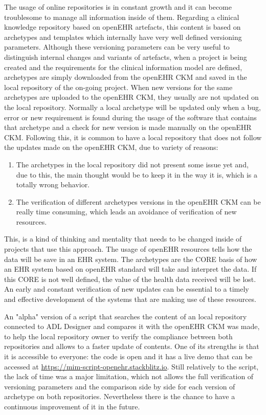 \documentclass[mim_thesis.tex]{subfiles}
\begin{document}
The usage of online repositories is in constant growth and it can become troublesome to manage all information inside of them. Regarding a clinical knowledge repository based on openEHR artefacts, this content is based on archetypes and templates which internally have very well defined versioning parameters.
Although these versioning parameters can be very useful to distinguish internal changes and variants of artefacts, when a project is being created and the requirements for the clinical information model are defined, archetypes are simply downloaded from the openEHR CKM and saved in the local repository of the on-going project. When new versions for the same archetypes are uploaded to the openEHR CKM, they usually are not updated on the local repository. Normally a local archetype will be updated only when a bug, error or new requirement is found during the usage of the software that contains that archetype and a check for new version is made manually on the openEHR CKM. Following this, it is common to have a local repository that does not follow the updates made on the openEHR CKM, due to variety of reasons: 
\begin{enumerate}[noitemsep]
\item The archetypes in the local repository did not present some issue yet and, due to this, the main thought would be to keep it in the way it is, which is a totally wrong behavior. 
\item The verification of different archetypes versions in the openEHR CKM can be really time consuming, which leads an avoidance of verification of new resources.
\end{enumerate}

This, is a kind of thinking and mentality that needs to be changed inside of projects that use this approach. The usage of openEHR resources tells how the data will be save in an EHR system. The archetypes are the CORE basis of how an EHR system based on openEHR standard will take and interpret the data. If this CORE is not well defined, the value of the health data received will be lost. An early and constant verification of new updates can be essential to a timely and effective development of the systems that are making use of these resources.

An "alpha" version of a script that searches the content of an local repository connected to ADL Designer and compares it with the openEHR CKM was made, to help the local repository owner to verify the compliance between both repositories and allows to a faster update of contents. One of its strengths is that it is accessible to everyone: the code is open and it has a live demo that can be accessed at \url{https://mim-script-openehr.stackblitz.io}. Still relatively to the script, the lack of time was a major limitation, which not allows the full verification of versioning parameters and the comparison side by side for each version of archetype on both repositories. Nevertheless there is the chance to have a continuous improvement of it in the future. 
\end{document}
